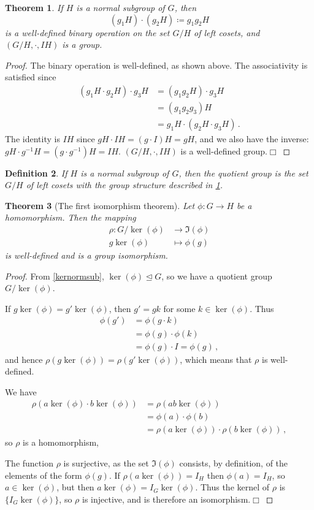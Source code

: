 \documentclass{article}
\theoremstyle{plain}\theoremheaderfont{\normalfont\itshape}\theorembodyfont{\rmfamily}\theoremseparator{.}\newtheorem*{rem}{Remark}\newtheorem*{ex}{Example}\newtheorem*{proof}{Proof}\newtheorem*{altp}{Alternative proof}
\theoremstyle{plain}\theoremheaderfont{\normalfont\bfseries}\theorembodyfont{\rmfamily}\theoremseparator{.}\newtheorem{thm}{Theorem}[section]\newtheorem{lem}[thm]{Lemma}\newtheorem{prop}[thm]{Proposition}\newtheorem*{cor}{Corollary}\newtheorem{defn}[thm]{Definition}\newtheorem{clm}[thm]{Claim}\newtheorem{clminproof}{Claim}
\theoremstyle{break}\theoremheaderfont{\normalfont\itshape}\theorembodyfont{\rmfamily}\theoremseparator{.\medskip}\newtheorem*{proofskip}{Proof}\newtheorem*{exs}{Examples}\newtheorem*{rems}{Remarks}
\theoremstyle{break}\theoremheaderfont{\normalfont\bfseries}\theorembodyfont{\rmfamily}\theoremseparator{.\medskip}\newtheorem{lemskip}[thm]{Lemma}\newtheorem{defnskip}[thm]{Definition}\newtheorem{propskip}[thm]{Proposition}\newtheorem{thmskip}[thm]{Theorem}
\numberwithin{equation}{section}
\newcommand{\qed}{\hfill\ensuremath{\Box}}
\begin{document}
	\begin{thm}\label{qgthm}
		If \(H\) is a normal subgroup of \(G\), then
		\[(g_1H)\cdot(g_2H)\coloneqq g_1g_2H\]
		is a well-defined binary operation on the set \(G/H\) of left cosets, and \((G/H,\cdot,IH)\) is a group.
	\end{thm}
	\begin{proof}
		The binary operation is well-defined, as shown above. The associativity is satisfied since
		\begin{align*}
			(g_1H\cdot g_2H)\cdot g_3H&=(g_1g_2 H)\cdot g_3H\\
			&=(g_1g_2g_3)H\\
			&=g_1H\cdot(g_2H\cdot g_3H)\,.
		\end{align*}
		The identity is \(IH\) since \(gH\cdot IH=(g\cdot I)H=gH\), and we also have the inverse: \(gH\cdot g^{-1}H=(g\cdot g^{-1})H=IH\). \((G/H,\cdot,IH)\) is a well-defined group.\qed
	\end{proof}
	\begin{defn}
		If \(H\) is a normal subgroup of \(G\), then the quotient group is the set \(G / H\) of left cosets with the group structure described in \cref{qgthm}.
	\end{defn}
	\begin{thm}[The first isomorphism theorem]\label{isothm}
		Let \(\phi: G\to H\) be a homomorphism. Then the mapping
		\begin{align*}
			\rho: G/\ker(\phi)&\to\Im(\phi)\\
			g\ker(\phi)&\mapsto\phi(g)
		\end{align*}
		is well-defined and is a group isomorphism.
	\end{thm}
	\begin{proof}
		From \cref{kernormsub}, \(\ker(\phi)\unlhd G\), so we have a quotient group \(G / \ker(\phi)\).

		If \(g\ker(\phi)=g'\ker(\phi)\), then \(g'=gk\) for some \(k\in\ker(\phi)\). Thus
		\begin{align*}
			\phi(g')&=\phi(g\cdot k)\\
			&=\phi(g)\cdot\phi(k)\\
			&=\phi(g)\cdot I=\phi(g)\,,
		\end{align*}
		and hence \(\rho(g\ker(\phi))=\rho(g'\ker(\phi))\), which means that \(\rho\) is well-defined.

		We have
		\begin{align*}
			\rho(a\ker(\phi)\cdot b\ker(\phi))&=\rho(ab\ker(\phi))\\
			&=\phi(a)\cdot\phi(b)\\
			&=\rho(a\ker(\phi))\cdot\rho(b\ker(\phi))\,,
		\end{align*}
		so \(\rho\) is a homomorphism,

		The function \(\rho\) is surjective, as the set \(\Im(\phi)\) consists, by definition, of the elements of the form \(\phi(g)\). If \(\rho(a\ker(\phi))=I_H\) then \(\phi(a)=I_H\), so \(a\in\ker(\phi)\), but then \(a\ker(\phi)=I_G\ker(\phi)\). Thus the kernel of \(\rho\) is \(\{I_G \ker(\phi)\}\), so \(\rho\) is injective, and is therefore an isomorphism.\qed
	\end{proof}
\end{document}
